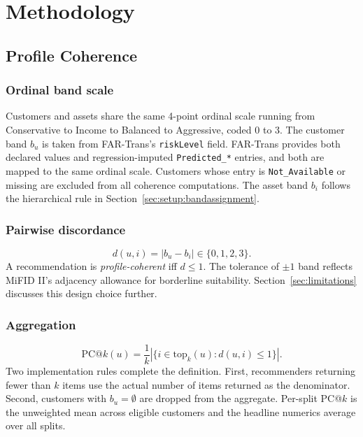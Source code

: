\section{Methodology}
\label{sec:method}

\subsection{Profile Coherence}
\label{sec:method:pck}

\subsubsection{Ordinal band scale}
Customers and assets share the same 4-point ordinal scale running from Conservative to Income to Balanced to Aggressive, coded 0 to 3. The customer band $b_u$ is taken from FAR-Trans's \texttt{riskLevel} field. FAR-Trans provides both declared values and regression-imputed \texttt{Predicted\_*} entries, and both are mapped to the same ordinal scale. Customers whose entry is \texttt{Not\_Available} or missing are excluded from all coherence computations. The asset band $b_i$ follows the hierarchical rule in Section~\ref{sec:setup:bandassignment}.

\subsubsection{Pairwise discordance}
\begin{equation}
d(u, i) = |b_u - b_i| \in \{0, 1, 2, 3\}.
\end{equation}
A recommendation is \emph{profile-coherent} iff $d \leq 1$. The tolerance of $\pm 1$ band reflects MiFID II's adjacency allowance for borderline suitability. Section~\ref{sec:limitations} discusses this design choice further.

\subsubsection{Aggregation}
\begin{equation}
\text{PC@}k(u) = \frac{1}{k} \left|\{ i \in \text{top}_k(u) : d(u, i) \leq 1 \}\right|.
\end{equation}
Two implementation rules complete the definition. First, recommenders returning fewer than $k$ items use the actual number of items returned as the denominator. Second, customers with $b_u = \emptyset$ are dropped from the aggregate. Per-split PC@$k$ is the unweighted mean across eligible customers and the headline numerics average over all splits.

